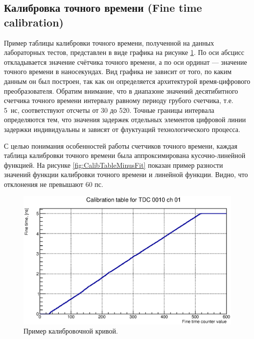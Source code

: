 \subsection{Калибровка точного времени (Fine time calibration)}\label{section:FTcalib}

Пример таблицы калибровки точного времени, полученной на данных лабораторных тестов, представлен в виде графика на рисунке \ref{fig:TypicalCalibTable}. По оси абсцисс откладывается значение счётчика точного времени, а по оси ординат --- значение точного времени в наносекундах. Вид графика не зависит от того, по каким данным он был построен, так как он определяется архитектурой время-цифрового преобразователя. Обратим внимание, что в диапазоне значений десятибитного счетчика точного времени интервалу равному периоду грубого счетчика, т.е. 5~нс, соответствуют отсчеты от 30 до 520. Точные границы интервала определяются тем, что значения задержек отдельных элементов цифровой линии задержки индивидуальны и зависят от флуктуаций технологического процесса.

С целью понимания особенностей работы счетчиков точного времени, каждая таблица калибровки точного времени была аппроксимирована кусочно-линейной функцией. На рисунке \ref{fig:CalibTableMinusFit} показан пример разности значений функции калибровки точного времени и линейной функции. Видно, что отклонения не превышают 60 пс.

\begin{figure}
\includegraphics[width=1.0\textwidth]{pictures/CalTable_0010_01.eps}
\caption{Пример калибровочной кривой.}
\label{fig:TypicalCalibTable}
\end{figure}

